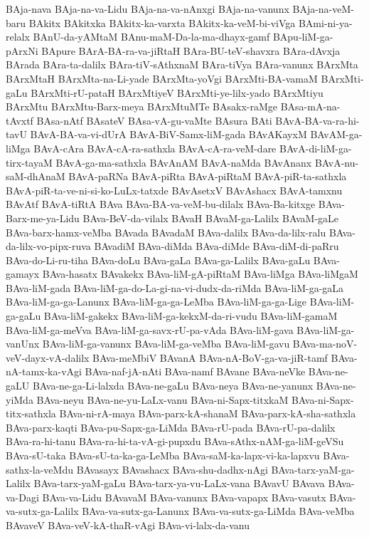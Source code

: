 {BAja-nava
BAja-na-va-Lidu
BAja-na-va-nAnxgi
BAja-na-vanunx
BAja-na-veM-baru
BAkitx
BAkitxka
BAkitx-ka-varxta
BAkitx-ka-veM-bi-viVga
BAmi-ni-ya-relalx
BAnU-da-yAMtaM
BAnu-maM-Da-la-ma-dhayx-gamf
BApu-liM-ga-pArxNi
BApure
BArA-BA-ra-va-jiRtaH
BAra-BU-teV-shavxra
BAra-dAvxja
BArada
BAra-ta-dalilx
BAra-tiV-sAthxnaM
BAra-tiVya
BAra-vanunx
BArxMta
BArxMtaH
BArxMta-na-Li-yade
BArxMta-yoVgi
BArxMti-BA-vamaM
BArxMti-gaLu
BArxMti-rU-pataH
BArxMtiyeV
BArxMti-ye-lilx-yado
BArxMtiyu
BArxMtu
BArxMtu-Barx-meya
BArxMtuMTe
BAsakx-raMge
BAsa-mA-na-tAvxtf
BAsa-nAtf
BAsateV
BAsa-vA-gu-vaMte
BAsura
BAti
BAvA-BA-va-ra-hi-tavU
BAvA-BA-va-vi-dUrA
BAvA-BiV-Samx-liM-gada
BAvAKayxM
BAvAM-ga-liMga
BAvA-cAra
BAvA-cA-ra-sathxla
BAvA-cA-ra-veM-dare
BAvA-di-liM-ga-tirx-tayaM
BAvA-ga-ma-sathxla
BAvAnAM
BAvA-naMda
BAvAnanx
BAvA-nu-saM-dhAnaM
BAvA-paRNa
BAvA-piRta
BAvA-piRtaM
BAvA-piR-ta-sathxla
BAvA-piR-ta-ve-ni-si-ko-LuLx-tatxde
BAvAsetxV
BAvAshacx
BAvA-tamxnu
BAvAtf
BAvA-tiRtA
BAva
BAva-BA-va-veM-bu-dilalx
BAva-Ba-kitxge
BAva-Barx-me-ya-Lidu
BAva-BeV-da-vilalx
BAvaH
BAvaM-ga-Lalilx
BAvaM-gaLe
BAva-barx-hamx-veMba
BAvada
BAvadaM
BAva-dalilx
BAva-da-lilx-ralu
BAva-da-lilx-vo-pipx-ruva
BAvadiM
BAva-diMda
BAva-diMde
BAva-diM-di-paRru
BAva-do-Li-ru-tiha
BAva-doLu
BAva-gaLa
BAva-ga-Lalilx
BAva-gaLu
BAva-gamayx
BAva-hasatx
BAvakekx
BAva-liM-gA-piRtaM
BAva-liMga
BAva-liMgaM
BAva-liM-gada
BAva-liM-ga-do-La-gi-na-vi-dudx-da-riMda
BAva-liM-ga-gaLa
BAva-liM-ga-ga-Lanunx
BAva-liM-ga-ga-LeMba
BAva-liM-ga-ga-Lige
BAva-liM-ga-gaLu
BAva-liM-gakekx
BAva-liM-ga-kekxM-da-ri-vudu
BAva-liM-gamaM
BAva-liM-ga-meVva
BAva-liM-ga-savx-rU-pa-vAda
BAva-liM-gava
BAva-liM-ga-vanUnx
BAva-liM-ga-vanunx
BAva-liM-ga-veMba
BAva-liM-gavu
BAva-ma-noV-veV-dayx-vA-dalilx
BAva-meMbiV
BAvanA
BAva-nA-BoV-ga-va-jiR-tamf
BAva-nA-tamx-ka-vAgi
BAva-naf-jA-nAti
BAva-namf
BAvane
BAva-neVke
BAva-ne-gaLU
BAva-ne-ga-Li-lalxda
BAva-ne-gaLu
BAva-neya
BAva-ne-yanunx
BAva-ne-yiMda
BAva-neyu
BAva-ne-yu-LaLx-vanu
BAva-ni-Sapx-titxkaM
BAva-ni-Sapx-titx-sathxla
BAva-ni-rA-maya
BAva-parx-kA-shanaM
BAva-parx-kA-sha-sathxla
BAva-parx-kaqti
BAva-pu-Sapx-ga-LiMda
BAva-rU-pada
BAva-rU-pa-dalilx
BAva-ra-hi-tanu
BAva-ra-hi-ta-vA-gi-pupxdu
BAva-sAthx-nAM-ga-liM-geVSu
BAva-sU-taka
BAva-sU-ta-ka-ga-LeMba
BAva-saM-ka-lapx-vi-ka-lapxvu
BAva-sathx-la-veMdu
BAvasayx
BAvashacx
BAva-shu-dadhx-nAgi
BAva-tarx-yaM-ga-Lalilx
BAva-tarx-yaM-gaLu
BAva-tarx-ya-vu-LaLx-vana
BAvavU
BAvava
BAva-va-Dagi
BAva-va-Lidu
BAvavaM
BAva-vanunx
BAva-vapapx
BAva-vasutx
BAva-va-sutx-ga-Lalilx
BAva-va-sutx-ga-Lanunx
BAva-va-sutx-ga-LiMda
BAva-veMba
BAvaveV
BAva-veV-kA-thaR-vAgi
BAva-vi-lalx-da-vanu
}
